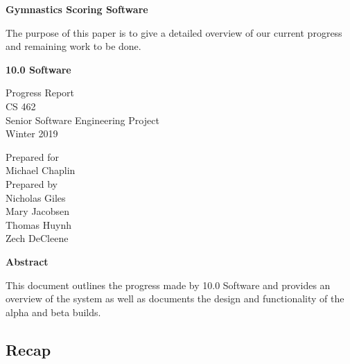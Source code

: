 \documentclass[letterpaper,10pt,draftclsnofoot,onecolumn,]{article}
\begin{document}
\noindent
\begin{titlepage}
    \begin{center}
        \vspace*{1cm}
        
        \textbf{Gymnastics Scoring Software}
        
        \vspace{0.5cm}
        The purpose of this paper is to give a detailed overview of our current progress and remaining work to be done.
        
        
        \vspace{1.5cm}
        
        \textbf{10.0 Software}
        
        Progress Report\\
        CS 462\\
        Senior Software Engineering Project\\
        Winter 2019
        
        \vspace{8cm}
        Prepared for\\
        Michael Chaplin\\
        
        \vspace{1.5cm}
        Prepared by\\
        Nicholas Giles\\
        Mary Jacobsen\\
        Thomas Huynh\\
        Zech DeCleene
        
        \vspace*{\fill}
        \begin{center}
            \textbf{\large{Abstract}}
        \end{center}
        \normalsize{This document outlines the progress made by 10.0 Software and provides an overview of the system as well as documents the design and functionality of the alpha and beta builds.}
        
    \end{center}
\end{titlepage}

\tableofcontents
\newpage

\begin{center}
\section{Recap}
\end{center}
\end{document}

